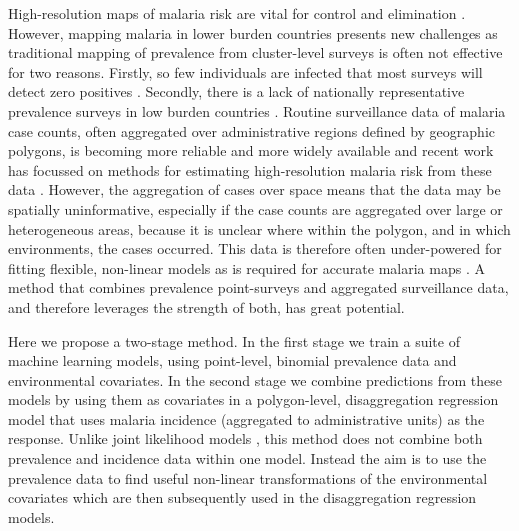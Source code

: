 \documentclass[review]{elsarticle}
\begin{document}


High-resolution maps of malaria risk are vital for control and elimination \citep{weiss2019mapping, battle2019mapping}.
However, mapping malaria in lower burden countries presents new challenges as traditional mapping of prevalence from cluster-level surveys \cite{weiss2019mapping,battle2019mapping, bhatt2017improved, bhatt2015effect} is often not effective for two reasons.
Firstly, so few individuals are infected that most surveys will detect zero positives \citep{sturrock2016mapping}.
Secondly, there is a lack of nationally representative prevalence surveys in low burden countries \citep{sturrock2016mapping, sturrock2014fine}. 
Routine surveillance data of malaria case counts, often aggregated over administrative regions defined by geographic polygons, is becoming more reliable and more widely available \citep{sturrock2016mapping} and recent work has focussed on methods for estimating high-resolution malaria risk from these data \citep{sturrock2014fine, wilson2017pointless, law2018variational, taylor2017continuous, li2012log, johnson2019spatially}. 
However, the aggregation of cases over space means that the data may be spatially uninformative, especially if the case counts are aggregated over large or heterogeneous areas, because it is unclear where within the polygon, and in which environments, the cases occurred. 
This data is therefore often under-powered for fitting flexible, non-linear models as is required for accurate malaria maps \citep{bhatt2017improved, bhatt2015effect}. 
A method that combines prevalence point-surveys and aggregated surveillance data, and therefore leverages the strength of both, has great potential.

Here we propose a two-stage method.
In the first stage we train a suite of machine learning models, using point-level, binomial prevalence data and environmental covariates.
In the second stage we combine predictions from these models by using them as covariates in a polygon-level, disaggregation regression model that uses  malaria incidence (aggregated to administrative units) as the response.
Unlike joint likelihood models \citep{wang2018generalized}, this method does not combine both prevalence and incidence data within one model.
Instead the aim is to use the prevalence data to find useful non-linear transformations of the environmental covariates which are then subsequently used in the disaggregation regression models.
\end{document}
